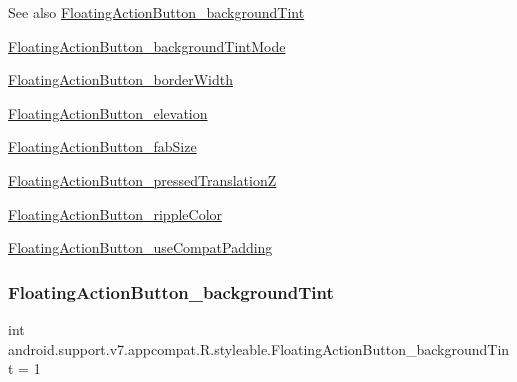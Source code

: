 \begin{DoxySeeAlso}{See also}
\hyperlink{classandroid_1_1support_1_1v7_1_1appcompat_1_1R_1_1styleable_a59bc6ada4a0ec9c433ebf84217630493}{Floating\+Action\+Button\+\_\+background\+Tint} 

\hyperlink{classandroid_1_1support_1_1v7_1_1appcompat_1_1R_1_1styleable_ab01d5ebdb493f8bb1f9595ee05409bfb}{Floating\+Action\+Button\+\_\+background\+Tint\+Mode} 

\hyperlink{classandroid_1_1support_1_1v7_1_1appcompat_1_1R_1_1styleable_a90c9e09b5a738fa569f0bf4b9cbe536e}{Floating\+Action\+Button\+\_\+border\+Width} 

\hyperlink{classandroid_1_1support_1_1v7_1_1appcompat_1_1R_1_1styleable_a11aec0e64f52fb4ec43da30d5c89dc2f}{Floating\+Action\+Button\+\_\+elevation} 

\hyperlink{classandroid_1_1support_1_1v7_1_1appcompat_1_1R_1_1styleable_abfe4b5cb807f029e53b6d0b103915d9d}{Floating\+Action\+Button\+\_\+fab\+Size} 

\hyperlink{classandroid_1_1support_1_1v7_1_1appcompat_1_1R_1_1styleable_a4b64b16277ffe93157834b6ae898ccb9}{Floating\+Action\+Button\+\_\+pressed\+TranslationZ} 

\hyperlink{classandroid_1_1support_1_1v7_1_1appcompat_1_1R_1_1styleable_a1b00a775eb9bce08afe75deef83f51f1}{Floating\+Action\+Button\+\_\+ripple\+Color} 

\hyperlink{classandroid_1_1support_1_1v7_1_1appcompat_1_1R_1_1styleable_ae8d13a787b0f198873c19c0c9ffbf158}{Floating\+Action\+Button\+\_\+use\+Compat\+Padding} 
\end{DoxySeeAlso}
\mbox{\label{classandroid_1_1support_1_1v7_1_1appcompat_1_1R_1_1styleable_a59bc6ada4a0ec9c433ebf84217630493}} 
\subsubsection{\texorpdfstring{Floating\+Action\+Button\+\_\+background\+Tint}{FloatingActionButton\_backgroundTint}}
{\footnotesize\ttfamily int android.\+support.\+v7.\+appcompat.\+R.\+styleable.\+Floating\+Action\+Button\+\_\+background\+Tint = 1\hspace{0.3cm}{\ttfamily [static]}}

